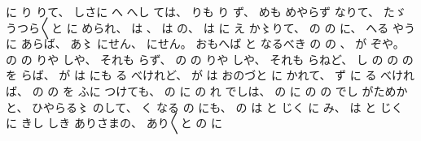 に
り
りて、
%
しさに
へ
%
へし
ては、
%
りも
り
ず、
%
めも
めやらず
なりて、
%
たゞ%
うつら〳〵と
に
められ、
%
は
、%
%
は
の、
%
は%
に
え
か〻りて、%
%
の
の
に、
%
へる
やうに
あらば、
%
あ〻%
にせん、
%
にせん。
%
おもへば
と
なるべき
の
の
、
%
が
ぞや。
%
の
の
りや
しや、
%
それも
らず、
%
の
の
りや
しや、
%
それも
らねど、
%
し
の
の
の
を
らば、
%
が
は
にも%
る
べけれど、
%
が
は
%
おのづと
に
かれて、
%
ず
に
る
べければ、
%
の
の
を
ふに
つけても、
%
の
に
の
れ
でしは、
%
の
に
の
の
でし
がためかと、
%
ひやらる〻%
のして、%
%
く
なる
の
にも、
%
の
は
と
じく
に
み、
%
は
と
じく
%
に
きし
しき
ありさまの、
%
あり〳〵と
の
に%
